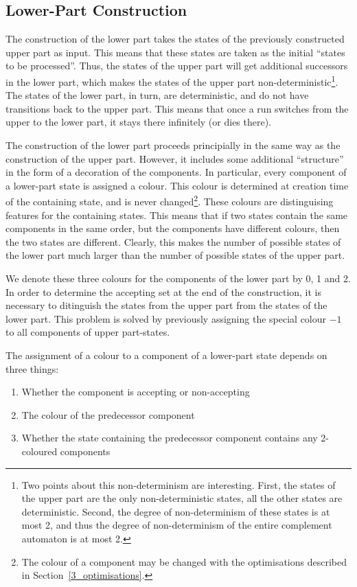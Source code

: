 \subsection{Lower-Part Construction}
\label{3_lower_part}
The construction of the lower part takes the states of the previously constructed upper part as input. This means that these states are taken as the initial ``states to be processed''. Thus, the states of the upper part will get additional successors in the lower part, which makes the states of the upper part non-deterministic\footnote{Two points about this non-determinism are interesting. First, the states of the upper part are the only non-deterministic states, all the other states are deterministic. Second, the degree of non-determinism of these states is at most 2, and thus the degree of non-determinism of the entire complement automaton is at most 2.}. The states of the lower part, in turn, are deterministic, and do not have transitions back to the upper part. This means that once a run switches from the upper to the lower part, it stays there infinitely (or dies there). 

The construction of the lower part proceeds principially in the same way as the construction of the upper part. However, it includes some additional ``structure'' in the form of a decoration of the components. In particular, every component of a lower-part state is assigned a colour. This colour is determined at creation time of the containing state, and is never changed\footnote{The colour of a component may be changed with the optimisations described in Section~\ref{3_optimisations}.}. These colours are distinguising features for the containing states. This means that if two states contain the same components in the same order, but the components have different colours, then the two states are different. Clearly, this makes the number of possible states of the lower part much larger than the number of possible states of the upper part.

We denote these three colours for the components of the lower part by 0, 1 and 2. In order to determine the accepting set at the end of the construction, it is necessary to ditinguish the states from the upper part from the states of the lower part. This problem is solved by previously assigning the special colour $-1$ to all components of upper part-states.

The assignment of a colour to a component of a lower-part state depends on three things:
\begin{enumerate}
\item Whether the component is accepting or non-accepting
\item The colour of the predecessor component
\item Whether the state containing the predecessor component contains any 2-coloured components
\end{enumerate}

